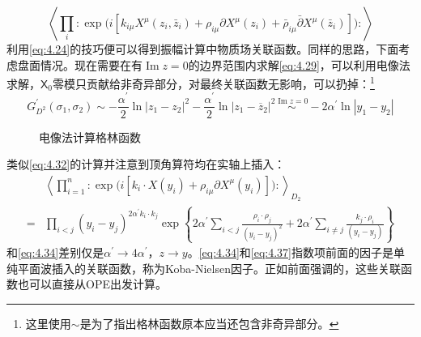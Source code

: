 \begin{equation}
	\left\langle\prod_i:\exp\bigg(i\left[k_{i\mu}X^\mu(z_i,\bar z_i)+\rho_{i\mu}\partial X^\mu(z_i)+\bar\rho_{i\mu}\bar\partial X^\mu(\bar z_i)\right]\bigg):\right\rangle
\end{equation}
利用\ref{eq:4.24}的技巧便可以得到振幅计算中物质场关联函数。同样的思路，下面考虑盘面情况。现在需要在有$\operatorname{Im} z = 0$的边界范围内求解\ref{eq:4.29}，可以利用电像法求解，$\mathsf{X}_0$零模只贡献给非奇异部分，对最终关联函数无影响，可以扔掉：\footnote{这里使用$\sim$是为了指出格林函数原本应当还包含非奇异部分。}
\begin{equation}
	G^{\prime}_{D^2}(\sigma_1,\sigma_2)\sim-\frac{\alpha^{\prime}}{2}\ln|z_1-z_2|^2-\frac{\alpha^{\prime}}{2}\ln|z_1-\overline{z}_2|^2\overset{\operatorname{Im} z = 0}{\sim} -2\alpha^\prime \ln|y_1-y_2|
\end{equation}
\begin{figure}[htbp]
	\centering
	\caption{电像法计算格林函数}
	\label{fig:6}
\end{figure}
类似\ref{eq:4.32}的计算并注意到顶角算符均在实轴上插入：
\begin{equation}
	\label{eq:4.37}
	\begin{aligned}
		&\left\langle\prod_{i=1}^n :\exp\bigg(i\left[k_i\cdot X(y_i)+\rho_{i\mu}\partial X^{\mu}(y_i)\right]\bigg):\right\rangle_{D_2}\\
	=&\prod_{i<j}(y_i-y_j)^{2{\alpha^{\prime}}k_i\cdot k_j}\exp\left\{2{\alpha^{\prime}}\sum_{i<j}\frac{\rho_i\cdot\rho_j}{(y_i-y_j)^2}+2\alpha^{\prime}\sum_{i\neq j}\frac{k_j\cdot\rho_i}{(y_i-y_j)}\right\}
	\end{aligned}
\end{equation}
和\ref{eq:4.34}差别仅是$\alpha^\prime\to4\alpha^\prime$，$z\to y$。\ref{eq:4.34}和\ref{eq:4.37}指数项前面的因子是单纯平面波插入的关联函数，称为Koba-Nielsen因子。正如前面强调的，这些关联函数也可以直接从OPE出发计算。

